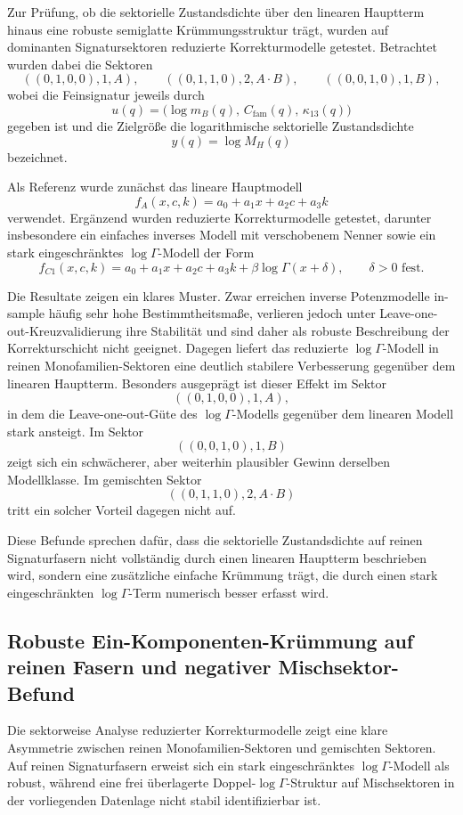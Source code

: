 \documentclass[11pt,a4paper]{article}
\theoremstyle{definition}
\theoremstyle{remark}
\begin{document}
Zur Prüfung, ob die sektorielle Zustandsdichte über den linearen Hauptterm hinaus eine robuste semiglatte Krümmungsstruktur trägt, wurden auf dominanten Signatursektoren reduzierte Korrekturmodelle getestet. Betrachtet wurden dabei die Sektoren
\[
((0,1,0,0),1,A),\qquad
((0,1,1,0),2,A\!\cdot\! B),\qquad
((0,0,1,0),1,B),
\]
wobei die Feinsignatur jeweils durch
\[
u(q)=\bigl(\log m_B(q),\,C_{\mathrm{fam}}(q),\,\kappa_{13}(q)\bigr)
\]
gegeben ist und die Zielgröße die logarithmische sektorielle Zustandsdichte
\[
y(q)=\log M_H(q)
\]
bezeichnet.

Als Referenz wurde zunächst das lineare Hauptmodell
\[
f_A(x,c,k)=a_0+a_1x+a_2c+a_3k
\]
verwendet. Ergänzend wurden reduzierte Korrekturmodelle getestet, darunter insbesondere ein einfaches inverses Modell mit verschobenem Nenner sowie ein stark eingeschränktes \(\log\Gamma\)-Modell der Form
\[
f_{C1}(x,c,k)
=
a_0+a_1x+a_2c+a_3k+\beta \log\Gamma(x+\delta),
\qquad \delta>0 \text{ fest}.
\]

Die Resultate zeigen ein klares Muster. Zwar erreichen inverse Potenzmodelle in-sample häufig sehr hohe Bestimmtheitsmaße, verlieren jedoch unter Leave-one-out-Kreuzvalidierung ihre Stabilität und sind daher als robuste Beschreibung der Korrekturschicht nicht geeignet. Dagegen liefert das reduzierte \(\log\Gamma\)-Modell in reinen Monofamilien-Sektoren eine deutlich stabilere Verbesserung gegenüber dem linearen Hauptterm. Besonders ausgeprägt ist dieser Effekt im Sektor
\[
((0,1,0,0),1,A),
\]
in dem die Leave-one-out-Güte des \(\log\Gamma\)-Modells gegenüber dem linearen Modell stark ansteigt. Im Sektor
\[
((0,0,1,0),1,B)
\]
zeigt sich ein schwächerer, aber weiterhin plausibler Gewinn derselben Modellklasse. Im gemischten Sektor
\[
((0,1,1,0),2,A\!\cdot\! B)
\]
tritt ein solcher Vorteil dagegen nicht auf.

Diese Befunde sprechen dafür, dass die sektorielle Zustandsdichte auf reinen Signaturfasern nicht vollständig durch einen linearen Hauptterm beschrieben wird, sondern eine zusätzliche einfache Krümmung trägt, die durch einen stark eingeschränkten \(\log\Gamma\)-Term numerisch besser erfasst wird.

\subsection{Robuste Ein-Komponenten-Krümmung auf reinen Fasern und negativer Mischsektor-Befund}

Die sektorweise Analyse reduzierter Korrekturmodelle zeigt eine klare Asymmetrie zwischen reinen Monofamilien-Sektoren und gemischten Sektoren. Auf reinen Signaturfasern erweist sich ein stark eingeschränktes \(\log\Gamma\)-Modell als robust, während eine frei überlagerte Doppel-\(\log\Gamma\)-Struktur auf Mischsektoren in der vorliegenden Datenlage nicht stabil identifizierbar ist.
\end{document}
